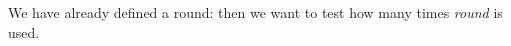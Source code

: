 \documentclass{omdoc}
\begin{document}
We have already defined a round:
then we want to test how many times \emph{round} is used.
\end{document}
